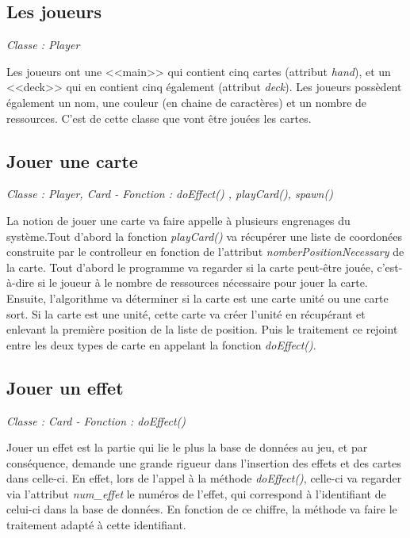 \documentclass[a4paper, titlepage]{livret}
\begin{document}
          \subsection{Les joueurs}
            \begin{center}
            \textit{Classe : Player}
            \end{center}
            Les joueurs ont une <<main>> qui contient cinq cartes (attribut \textit{hand}), et un <<deck>> qui en contient cinq également (attribut \textit{deck}). Les joueurs possèdent également un nom,  une couleur (en chaine de caractères) et un nombre de ressources. C'est de cette classe que vont être jouées les cartes.
            
          \subsection{Jouer une carte}
            \begin{center}
            \textit{Classe : Player, Card - Fonction : doEffect() , playCard(),  spawn()}
            \end{center}
            La notion de jouer une carte va faire appelle à plusieurs engrenages du système.Tout d'abord la fonction \textit{playCard()} va récupérer une liste de coordonées construite par le controlleur en fonction de l'attribut \textit{nomberPositionNecessary} de la carte. Tout d'abord le programme va regarder si la carte peut-être jouée, c'est-à-dire si le joueur à le nombre de ressources nécessaire pour jouer la carte. Ensuite, l'algorithme va déterminer si la carte est une carte unité ou une carte sort. Si la carte est une unité, cette carte va créer l'unité en récupérant et enlevant la première position de la liste de position. Puis le traitement ce rejoint entre les deux types de carte en appelant la fonction \textit{doEffect()}.
            
          \subsection{Jouer un effet}
            \begin{center}
            \textit{Classe : Card - Fonction : doEffect()}
            \end{center}
            Jouer un effet est la partie qui lie le plus la base de données au jeu, et par conséquence, demande une grande rigueur dans l'insertion des effets et des cartes dans celle-ci. En effet, lors de l'appel à la méthode \textit{doEffect()}, celle-ci va regarder via l'attribut \textit{num\_effet} le numéros de l'effet, qui correspond à l'identifiant de celui-ci dans la base de données. En fonction de ce chiffre, la méthode va faire le traitement adapté à cette identifiant.
\end{document}
